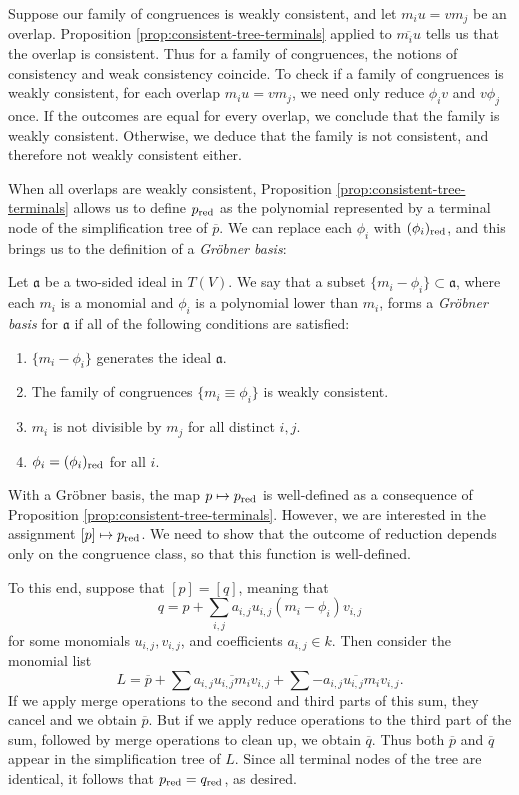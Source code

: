 Suppose our family of congruences is weakly consistent, and let $m_i u = v m_j$ be an overlap. Proposition \ref{prop:consistent-tree-terminals} applied to $\overline{m_i u}$ tells us that the overlap is consistent. Thus for a family of congruences, the notions of consistency and weak consistency coincide. To check if a family of congruences is weakly consistent, for each overlap $m_i u = v m_j$, we need only reduce $\phi_i v$ and $v \phi_j$ once. If the outcomes are equal for every overlap, we conclude that the family is weakly consistent. Otherwise, we deduce that the family is not consistent, and therefore not weakly consistent either.

When all overlaps are weakly consistent, Proposition \ref{prop:consistent-tree-terminals} allows us to define $p_{\mathrm{red}}$ as the polynomial represented by a terminal node of the simplification tree of $\overline{p}$. We can replace each $\phi_i$ with $(\phi_i)_{\mathrm{red}}$, and this brings us to the definition of a \emph{Gr\"obner basis}:
\begin{defn}\label{def:grobner}
	Let $\mathfrak{a}$ be a two-sided ideal in $T(V)$. We say that a subset $\{m_i - \phi_i\}\subset \mathfrak{a}$, where each $m_i$ is a monomial and $\phi_i$ is a polynomial lower than $m_i$, forms a \emph{Gr\"obner basis} for $\mathfrak{a}$ if all of the following conditions are satisfied:
	\begin{enumerate}
		\item $\{m_i - \phi_i\}$ generates the ideal $\mathfrak{a}$.
		\item\label{item:grobnerconsistent} The family of congruences $\{m_i \equiv \phi_i\}$ is weakly consistent.
		\item $m_i$ is not divisible by $m_j$ for all distinct $i,j$.
		\item $\phi_i = (\phi_i)_{\mathrm{red}}$ for all $i$.
	\end{enumerate}
\end{defn}
With a Gr\"obner basis, the map $p\mapsto p_{\mathrm{red}}$ is well-defined as a consequence of Proposition \ref{prop:consistent-tree-terminals}. However, we are interested in the assignment $[p]\mapsto p_{\mathrm{red}}$. We need to show that the outcome of reduction depends only on the congruence class, so that this function is well-defined.

To this end, suppose that $[p] = [q]$, meaning that
\[
	q = p + \sum_{i,j} a_{i,j}u_{i,j} (m_i - \phi_i) v_{i,j}
\]
for some monomials $u_{i,j}, v_{i,j}$, and coefficients $a_{i,j}\in k$. Then consider the monomial list
\[
	L= \overline{p} + \sum \overline{a_{i,j}u_{i,j}m_iv_{i,j}} + \sum \overline{-a_{i,j}u_{i,j}m_i v_{i,j}}.
\]
If we apply merge operations to the second and third parts of this sum, they cancel and we obtain $\overline{p}$. But if we apply reduce operations to the third part of the sum, followed by merge operations to clean up, we obtain $\overline{q}$. Thus both $\overline{p}$ and $\overline{q}$ appear in the simplification tree of $L$. Since all terminal nodes of the tree are identical, it follows that $p_{\mathrm{red}} = q_{\mathrm{red}}$, as desired.

